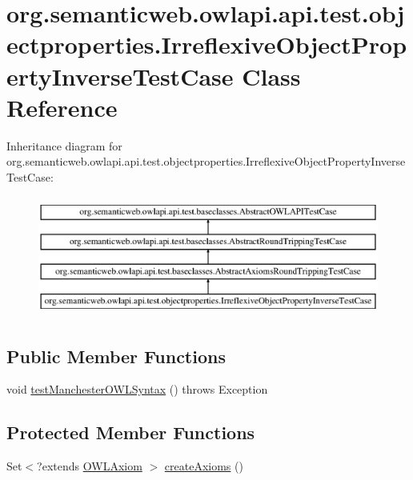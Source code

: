 \hypertarget{classorg_1_1semanticweb_1_1owlapi_1_1api_1_1test_1_1objectproperties_1_1_irreflexive_object_property_inverse_test_case}{\section{org.\-semanticweb.\-owlapi.\-api.\-test.\-objectproperties.\-Irreflexive\-Object\-Property\-Inverse\-Test\-Case Class Reference}
\label{classorg_1_1semanticweb_1_1owlapi_1_1api_1_1test_1_1objectproperties_1_1_irreflexive_object_property_inverse_test_case}
}
Inheritance diagram for org.\-semanticweb.\-owlapi.\-api.\-test.\-objectproperties.\-Irreflexive\-Object\-Property\-Inverse\-Test\-Case\-:\begin{figure}[H]
\begin{center}
\leavevmode
\includegraphics[height=4.000000cm]{classorg_1_1semanticweb_1_1owlapi_1_1api_1_1test_1_1objectproperties_1_1_irreflexive_object_property_inverse_test_case}
\end{center}
\end{figure}
\subsection*{Public Member Functions}
\begin{DoxyCompactItemize}
\item 
void \hyperlink{classorg_1_1semanticweb_1_1owlapi_1_1api_1_1test_1_1objectproperties_1_1_irreflexive_object_property_inverse_test_case_ac01e8160dbfe8c173866ac56d356ea95}{test\-Manchester\-O\-W\-L\-Syntax} ()  throws Exception 
\end{DoxyCompactItemize}
\subsection*{Protected Member Functions}
\begin{DoxyCompactItemize}
\item 
Set$<$?extends \hyperlink{interfaceorg_1_1semanticweb_1_1owlapi_1_1model_1_1_o_w_l_axiom}{O\-W\-L\-Axiom} $>$ \hyperlink{classorg_1_1semanticweb_1_1owlapi_1_1api_1_1test_1_1objectproperties_1_1_irreflexive_object_property_inverse_test_case_a848ac3d3f6e7efb941f3ff6217778e12}{create\-Axioms} ()
\end{DoxyCompactItemize}


